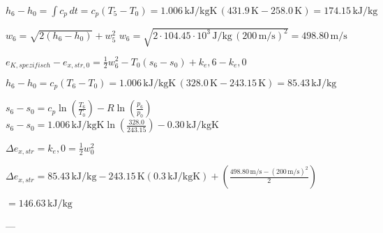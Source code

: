 \( h_6 - h_0 = \int c_p \, dt = c_p (T_5 - T_0) = 1.006 \, \text{kJ/kgK} \, (431.9 \, \text{K} - 258.0 \, \text{K}) = 174.15 \, \text{kJ/kg} \)

\( w_6 = \sqrt{2(h_6 - h_0)} + w_5^2 \)  
\( w_6 = \sqrt{2 \cdot 104.45 \cdot 10^3 \, \text{J/kg} \, (200 \, \text{m/s})^2} = 498.80 \, \text{m/s} \)

\( e_{K,spezifisch} - e_{x,str,0} = \frac{1}{2} w_6^2 - T_0 (s_6 - s_0) + k_e,6 - k_e,0 \)

\( h_6 - h_0 = c_p (T_6 - T_0) = 1.006 \, \text{kJ/kgK} \, (328.0 \, \text{K} - 243.15 \, \text{K}) = 85.43 \, \text{kJ/kg} \)

\( s_6 - s_0 = c_p \ln \left( \frac{T_6}{T_0} \right) - R \ln \left( \frac{p_6}{p_0} \right) \)  
\( s_6 - s_0 = 1.006 \, \text{kJ/kgK} \ln \left( \frac{328.0}{243.15} \right) - 0.30 \, \text{kJ/kgK} \)

\( \Delta e_{x,str} = k_e,0 = \frac{1}{2} w_0^2 \)

\( \Delta e_{x,str} = 85.43 \, \text{kJ/kg} - 243.15 \, \text{K} (0.3 \, \text{kJ/kgK}) + \left( \frac{498.80 \, \text{m/s} - (200 \, \text{m/s})^2}{2} \right) \)

\( = 146.63 \, \text{kJ/kg} \)

---
